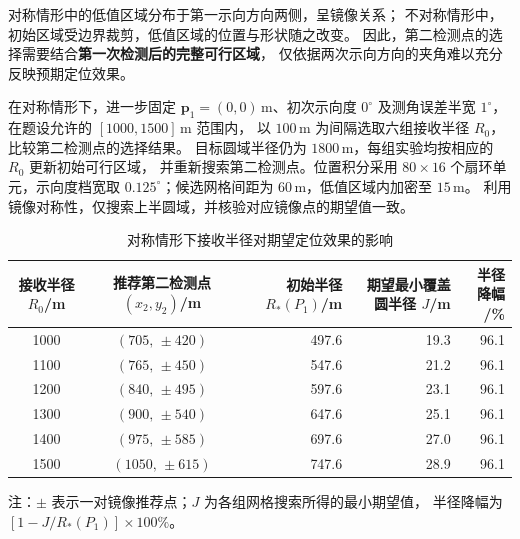 \documentclass[UTF8,a4paper,12pt]{ctexart}
\begin{document}
对称情形中的低值区域分布于第一示向方向两侧，呈镜像关系；
不对称情形中，初始区域受边界裁剪，低值区域的位置与形状随之改变。
因此，第二检测点的选择需要结合\textbf{第一次检测后的完整可行区域}，
仅依据两次示向方向的夹角难以充分反映预期定位效果。

在对称情形下，进一步固定 $\boldsymbol p_1=(0,0)\,\mathrm m$、初次示向度 $0^\circ$
及测角误差半宽 $1^\circ$，在题设允许的 $[1000,1500]\,\mathrm m$ 范围内，
以 $100\,\mathrm m$ 为间隔选取六组接收半径 $R_0$，比较第二检测点的选择结果。
目标圆域半径仍为 $1800\,\mathrm m$，每组实验均按相应的 $R_0$ 更新初始可行区域，
并重新搜索第二检测点。位置积分采用 $80\times16$ 个扇环单元，示向度档宽取
$0.125^\circ$；候选网格间距为 $60\,\mathrm m$，低值区域内加密至 $15\,\mathrm m$。
利用镜像对称性，仅搜索上半圆域，并核验对应镜像点的期望值一致。

\begin{table}[htbp]
  \centering
  \caption{对称情形下接收半径对期望定位效果的影响}
  \label{tab:q2-r0}
  \small
  \setlength{\tabcolsep}{7pt}
  \renewcommand{\arraystretch}{1.25}
  \begin{tabular}{ccrrr}
    \toprule
    \shortstack{接收半径\\$R_0$/m} &
    \shortstack{推荐第二检测点\\$(x_2,y_2)$/m} &
    \shortstack{初始半径\\$R_*(P_1)$/m} &
    \shortstack{期望最小覆盖\\圆半径 $J$/m} &
    \shortstack{半径降幅\\/\%} \\
    \midrule
    1000 & $(705,\,\pm 420)$ & 497.6 & 19.3 & 96.1 \\
    1100 & $(765,\,\pm 450)$ & 547.6 & 21.2 & 96.1 \\
    1200 & $(840,\,\pm 495)$ & 597.6 & 23.1 & 96.1 \\
    1300 & $(900,\,\pm 540)$ & 647.6 & 25.1 & 96.1 \\
    1400 & $(975,\,\pm 585)$ & 697.6 & 27.0 & 96.1 \\
    1500 & $(1050,\,\pm 615)$ & 747.6 & 28.9 & 96.1 \\
    \bottomrule
  \end{tabular}
  \par\smallskip
  \parbox{0.94\linewidth}{\footnotesize 注：$\pm$ 表示一对镜像推荐点；$J$ 为各组网格搜索所得的最小期望值，
  半径降幅为 $[1-J/R_*(P_1)]\times100\%$。}
\end{table}
\end{document}

